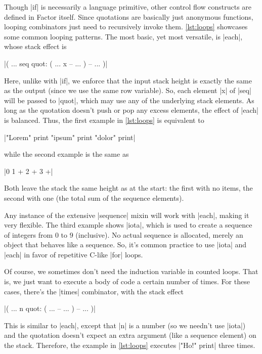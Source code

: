 
Though \factor|if| is necessarily a language primitive, other control flow
constructs are defined in Factor itself.  Since quotations are basically just
anonymous functions, looping combinators just need to recursively invoke them.
\vref{lst:loops} showcases some common looping patterns.  The most basic, yet
most versatile, is \factor|each|, whose stack effect is
%
\begin{center}
%
  \factor|( ... seq quot: ( ... x -- ... ) -- ... )|
%
\end{center}
%
\noindent Here, unlike with \factor|if|, we enforce that the input stack height
is exactly the same as the output (since we use the same row variable).  So,
each element \factor|x| of \factor|seq| will be passed to \factor|quot|, which
may use any of the underlying stack elements.  As long as the quotation doesn't
push or pop any excess elements, the effect of \factor|each| is balanced.
Thus, the first example in \vref{lst:loops} is equivalent to
%
\begin{center}
%
  \factor|"Lorem" print "ipsum" print "dolor" print|
%
\end{center}
%
\noindent while the second example is the same as
%
\begin{center}
%
  \factor|0 1 + 2 + 3 +|
%
\end{center}
%
\noindent Both leave the stack the same height as at the start: the first with
no items, the second with one (the total sum of the sequence elements).

Any instance of the extensive \factor|sequence| mixin will work with
\factor|each|, making it very flexible.  The third example shows \factor|iota|,
which is used to create a  sequence of integers from $0$ to $9$
(inclusive).  No actual sequence is allocated, merely an object that behaves
like a sequence.  So, it's common practice to use \factor|iota| and
\factor|each| in favor of repetitive C-like |for| loops.

Of course, we sometimes don't need the induction variable in counted loops.
That is, we just want to execute a body of code a certain number of times.  For
these cases, there's the \factor|times| combinator, with the stack effect
%
\begin{center}
%
  \factor|( ... n quot: ( ... -- ... ) -- ... )|
%
\end{center}
%
\noindent This is similar to \factor|each|, except that \factor|n| is a number
(so we needn't use \factor|iota|) and the quotation doesn't expect an extra
argument (like a sequence element) on the stack.  Therefore, the example in
\vref{lst:loops} executes
%
\factor|"Ho!" print|
%
three times.

